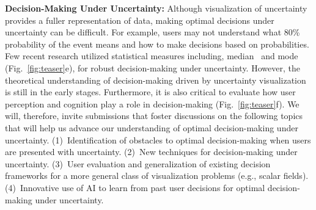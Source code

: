 \textbf{Decision-Making Under Uncertainty:} Although visualization of uncertainty provides a fuller representation of data, making optimal decisions under uncertainty can be difficult. For example, users may not understand what 80\% probability of the event means and how to make decisions based on probabilities. Few recent research utilized statistical measures including, median~\cite{contourBoxplots} and mode~\cite{TA:Athawale:2016:nonparametricIsosurfaces} (Fig.~\ref{fig:teaser}e), for robust decision-making under uncertainty. However, the theoretical understanding of decision-making driven by uncertainty visualization is still in the early stages. Furthermore, it is also critical to evaluate how user perception and cognition play a role in decision-making (Fig.~\ref{fig:teaser}f).  We will, therefore, invite submissions that foster discussions on the following topics that will help us advance our understanding of optimal decision-making under uncertainty. (1)~Identification of obstacles to optimal decision-making when users are presented with uncertainty. (2)~New techniques for decision-making under uncertainty. (3)~User evaluation and generalization of existing decision frameworks for a more general class of visualization problems (e.g., scalar fields). (4)~Innovative use of AI to learn from past user decisions for optimal decision-making under uncertainty.



